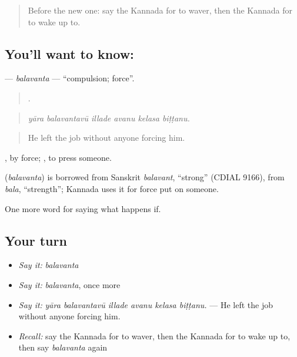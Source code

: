 \label{lesson:KA-C420-balavanta}



\begin{quote}
Before the new one: say the Kannada for to waver, then the Kannada for to wake up to.
\end{quote}

\subsection*{You'll want to know: }
\textbf{} — \emph{balavanta} — \textquotedblleft{}compulsion; force\textquotedblright{}.

\begin{quote}
     .
\end{quote}

\begin{quote}
\emph{yāra balavantavū illade avanu kelasa biṭṭanu.}
\end{quote}

\begin{quote}
He left the job without anyone forcing him.
\end{quote}

, by force;  , to press someone.

\begin{cousinweb}
\textbf{} (\emph{balavanta}) is borrowed from Sanskrit \emph{balavant}, \textquotedblleft{}strong\textquotedblright{} (CDIAL 9166), from \emph{bala}, \textquotedblleft{}strength\textquotedblright{}; Kannada uses it for force put on someone.
\end{cousinweb}

\begin{grammarlens}[title={What you've built}]
One more word for saying what happens if.
\end{grammarlens}

\subsection*{Your turn}
\begin{itemize}
\raggedright
  \item \emph{Say it:} \emph{balavanta}
  \item \emph{Say it:} \emph{balavanta}, once more
  \item \emph{Say it:} \emph{yāra balavantavū illade avanu kelasa biṭṭanu.} — He left the job without anyone forcing him.
  \item \emph{Recall:} say the Kannada for to waver, then the Kannada for to wake up to, then say \emph{balavanta} again
\end{itemize}

